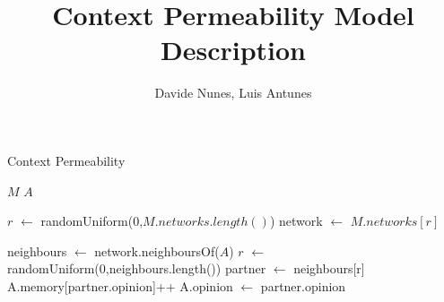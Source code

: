 \documentclass{article}
\title{Context Permeability Model Description}
\author{Davide Nunes, Luis Antunes}
\begin{document}
 
 \maketitle
 
 \begin{algorithm}
 \caption{Context Permeability}
 \label{model:context_permeability}
 \begin{algorithmic}
 \vspace{0.5em}
 \STATE $M$ 
 \STATE $A$ 
 \\ \hrulefill 
 
 \STATE{}
 \STATE $r$ $\leftarrow$ randomUniform(0,$ M.networks.length() $)
 \STATE network $\leftarrow$ $M.networks[r]$
 
 \STATE
 \STATE {}
 \STATE neighbours $\leftarrow$ network.neighboursOf($A$) 
 \STATE $r$ $\leftarrow$ randomUniform(0,neighbours.length())
 \STATE partner $\leftarrow$ neighbours[r]
 \STATE
 \STATE {}
 \STATE {}
 \STATE A.memory[partner.opinion]++
 \STATE A.opinion $\leftarrow$ partner.opinion
 \ENDIF
 \end{algorithmic}
 \end{algorithm}
 
\end{document}
